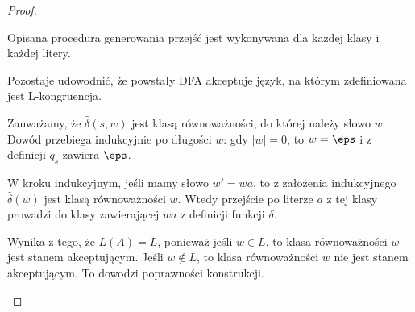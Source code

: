 \begin{proof}
\begin{description}
        Opisana procedura generowania przejść jest wykonywana dla każdej klasy i każdej litery.
        
        Pozostaje udowodnić, że powstały DFA akceptuje język, na którym zdefiniowana jest L-kongruencja. 
        
        Zauważamy, że \(\hat\delta(s, w) \) jest klasą równoważności, do której należy słowo \(w\). Dowód przebiega indukcyjnie po długości \(w\): gdy \(|w| = 0\), to \( w = \eps \) i z definicji \(q_s\) zawiera \(\eps\).
        
        W kroku indukcyjnym, jeśli mamy słowo \(w' = wa\), to z założenia indukcyjnego \(\hat\delta(w)\) jest klasą równoważności \(w\). Wtedy przejście po literze \(a\) z tej klasy prowadzi do klasy zawierającej \(wa\) z definicji funkcji \(\delta\). 
        
        Wynika z tego, że \(L(A) = L\), ponieważ jeśli \(w \in L\), to klasa równoważności \(w\) jest stanem akceptującym. Jeśli \(w \notin L\), to klasa równoważności \(w\) nie jest stanem akceptującym. To dowodzi poprawności konstrukcji.
    \end{description}
\end{proof}